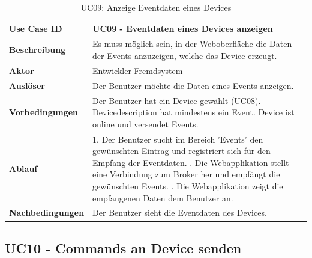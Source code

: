 \begin{table}[H]
\begin{tabularx}{\textwidth}{|l|X|}

 \hline
 {\bf Use Case ID }    & UC09 - Eventdaten eines Devices anzeigen \\  \hline
 {\bf Beschreibung }   & Es muss möglich sein, in der Weboberfläche die Daten der Events anzuzeigen, welche das Device erzeugt. \\ \hline
 {\bf Aktor }          & Entwickler Fremdsystem \\ \hline
 {\bf Auslöser }       & Der Benutzer möchte die Daten eines Events anzeigen. \\ \hline
 {\bf Vorbedingungen } & 
     Der Benutzer hat ein Device gewählt (UC08). \newline
     Devicedescription hat mindestens ein Event. \newline 
     Device ist online und versendet Events. \\ \hline
 {\bf Ablauf }         & 
     1. Der Benutzer sucht im Bereich 'Events' den gewünschten Eintrag und registriert sich für den Empfang der Eventdaten. \newline
     2. Die Webapplikation stellt eine Verbindung zum Broker her und empfängt die gewünschten Events. \newline
     3. Die Webapplikation zeigt die empfangenen Daten dem Benutzer an. \\ \hline
 {\bf Nachbedingungen} & Der Benutzer sieht die Eventdaten des Devices. \\ \hline
  
\end{tabularx}
\caption{UC09: Anzeige Eventdaten eines Devices}
\end{table}

\subsection{UC10 - Commands an Device senden}

